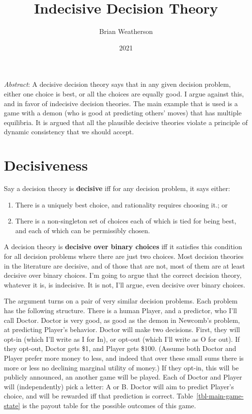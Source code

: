 \documentclass[
  11pt,
  letterpaper,
  DIV=11,
  numbers=noendperiod,
  twoside]{scrartcl}
\title{Indecisive Decision Theory}
\author{Brian Weatherson}
\date{2021}
\providecommand{\tightlist}{%
  \setlength{\itemsep}{0pt}\setlength{\parskip}{0pt}}
\renewenvironment{abstract}
 {\vspace{-1.25cm}
 \quotation\small\noindent\emph{Abstract}:}
 {\endquotation}
\renewenvironment{abstract}
 {\quotation\small\noindent\emph{Abstract}:}
 {\endquotation\vspace{-0.02cm}}
\begin{document}
\maketitle
\begin{abstract}
A decisive decision theory says that in any given decision problem,
either one choice is best, or all the choices are equally good. I argue
against this, and in favor of indecisive decision theories. The main
example that is used is a game with a demon (who is good at predicting
others' moves) that has multiple equilibria. It is argued that all the
plausible decisive theories violate a principle of dynamic consistency
that we should accept.
\end{abstract}


\section{Decisiveness}\label{decisiveness}

Say a decision theory is \textbf{decisive} iff for any decision problem,
it says either:

\begin{enumerate}
\def\labelenumi{\arabic{enumi}.}
\tightlist
\item
  There is a uniquely best choice, and rationality requires choosing
  it.; or
\item
  There is a non-singleton set of choices each of which is tied for
  being best, and each of which can be permissibly chosen.
\end{enumerate}

A decision theory is \textbf{decisive over binary choices} iff it
satisfies this condition for all decision problems where there are just
two choices. Most decision theories in the literature are decisive, and
of those that are not, most of them are at least decisive over binary
choices. I'm going to argue that the correct decision theory, whatever
it is, is indecisive. It is not, I'll argue, even decisive over binary
choices.

The argument turns on a pair of very similar decision problems. Each
problem has the following structure. There is a human Player, and a
predictor, who I'll call Doctor. Doctor is very good, as good as the
demon in Newcomb's problem, at predicting Player's behavior. Doctor will
make two decisions. First, they will opt-in (which I'll write as I for
In), or opt-out (which I'll write as O for out). If they opt-out, Doctor
gets \$1, and Player gets \$100. (Assume both Doctor and Player prefer
more money to less, and indeed that over these small sums there is more
or less no declining marginal utility of money.) If they opt-in, this
will be publicly announced, an another game will be played. Each of
Doctor and Player will (independently) pick a letter: A or B. Doctor
will aim to predict Player's choice, and will be rewarded iff that
prediction is correct. Table~\ref{tbl-main-game-state} is the payout
table for the possible outcomes of this game.
\end{document}
